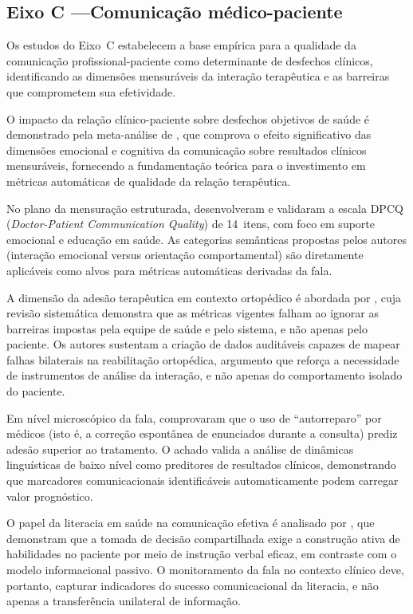 \documentclass[a4paper,fleqn]{cas-sc}
\begin{document}
\subsection{Eixo C —Comunicação médico-paciente}
\label{subsec:eixoC}

Os estudos do Eixo~C estabelecem a base empírica para a qualidade
da comunicação profissional-paciente como determinante de desfechos
clínicos, identificando as dimensões mensuráveis da interação
terapêutica e as barreiras que comprometem sua efetividade.

O impacto da relação clínico-paciente sobre desfechos objetivos de
saúde é demonstrado pela meta-análise de \citet{Kelley2014}, que
comprova o efeito significativo das dimensões emocional e cognitiva
da comunicação sobre resultados clínicos mensuráveis, fornecendo a
fundamentação teórica para o investimento em métricas automáticas de
qualidade da relação terapêutica.

No plano da mensuração estruturada, \citet{Shao2025} desenvolveram e
validaram a escala DPCQ (\textit{Doctor-Patient Communication
Quality}) de 14~itens, com foco em suporte emocional e educação em
saúde. As categorias semânticas propostas pelos autores (interação
emocional versus orientação comportamental) são diretamente
aplicáveis como alvos para métricas automáticas derivadas da fala.

A dimensão da adesão terapêutica em contexto ortopédico é abordada
por \citet{Rucinski2022}, cuja revisão sistemática demonstra que as
métricas vigentes falham ao ignorar as barreiras impostas pela equipe
de saúde e pelo sistema, e não apenas pelo paciente. Os autores
sustentam a criação de dados auditáveis capazes de mapear falhas
bilaterais na reabilitação ortopédica, argumento que reforça a
necessidade de instrumentos de análise da interação, e não apenas
do comportamento isolado do paciente.

Em nível microscópico da fala, \citet{McCabe2018} comprovaram que o
uso de \enquote{autorreparo} por médicos (isto é, a correção
espontânea de enunciados durante a consulta) prediz adesão superior
ao tratamento. O achado valida a análise de dinâmicas linguísticas de
baixo nível como preditores de resultados clínicos, demonstrando que
marcadores comunicacionais identificáveis automaticamente podem
carregar valor prognóstico.

O papel da literacia em saúde na comunicação efetiva é analisado por
\citet{Muscat2020}, que demonstram que a tomada de decisão
compartilhada exige a construção ativa de habilidades no paciente por
meio de instrução verbal eficaz, em contraste com o modelo
informacional passivo. O monitoramento da fala no contexto clínico
deve, portanto, capturar indicadores do sucesso comunicacional da
literacia, e não apenas a transferência unilateral de informação.
\end{document}
